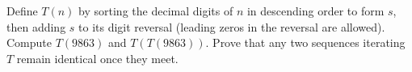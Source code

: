 Define $T(n)$ by sorting the decimal digits of $n$ in descending order to form $s$, then adding $s$ to its digit reversal (leading zeros in the reversal are allowed). Compute $T(9863)$ and $T(T(9863))$. Prove that any two sequences iterating $T$ remain identical once they meet.
